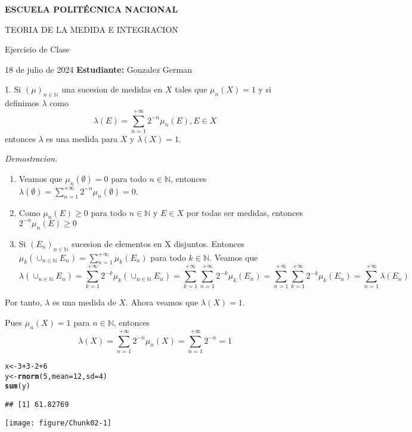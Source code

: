\documentclass{article}\usepackage[]{graphicx}\usepackage[]{xcolor}
\makeatletter
\def\maxwidth{ %
  \ifdim\Gin@nat@width>\linewidth
    \linewidth
  \else
    \Gin@nat@width
  \fi
}
\newcommand{\hlnum}[1]{\textcolor[rgb]{0.686,0.059,0.569}{#1}}%
\newcommand{\hlopt}[1]{\textcolor[rgb]{0,0,0}{#1}}%
\newcommand{\hldef}[1]{\textcolor[rgb]{0.345,0.345,0.345}{#1}}%
\newcommand{\hlkwb}[1]{\textcolor[rgb]{0.69,0.353,0.396}{#1}}%
\newcommand{\hlkwc}[1]{\textcolor[rgb]{0.333,0.667,0.333}{#1}}%
\newcommand{\hlkwd}[1]{\textcolor[rgb]{0.737,0.353,0.396}{\textbf{#1}}}%
\newenvironment{kframe}{%
 \def\at@end@of@kframe{}%
 \ifinner\ifhmode%
  \def\at@end@of@kframe{\end{minipage}}%
  \begin{minipage}{\columnwidth}%
 \fi\fi%
 \def\FrameCommand##1{\hskip\@totalleftmargin \hskip-\fboxsep
 \colorbox{shadecolor}{##1}\hskip-\fboxsep
     \hskip-\linewidth \hskip-\@totalleftmargin \hskip\columnwidth}%
 \MakeFramed {\advance\hsize-\width
   \@totalleftmargin\z@ \linewidth\hsize
   \@setminipage}}%
 {\par\unskip\endMakeFramed%
 \at@end@of@kframe}
\newenvironment{knitrout}{}{} %
\makeatother
\begin{document}
\hrulefill

\begin{center}
\textbf{ESCUELA POLITÉCNICA NACIONAL}

TEORIA DE LA MEDIDA E INTEGRACION
\end{center}
\begin{center}
    Ejercicio de Clase
\end{center}

18 de julio de 2024 \hfill \textbf{Estudiante:} Gonzalez German

\hrulefill

1. Si $(\mu)_{n \in \mathbb{N}}$ una sucesion de medidas en $X$ tales que $\mu_n(X)=1$ y si definimos $\lambda$ como $$\lambda(E)=\sum_{n=1}^{+\infty} 2^{-n} \mu_{n}(E) , E \in X$$
entonces $\lambda$ es una medida para $X$ y $\lambda(X)=1$.

\textit{Demostracion.} 
\begin{enumerate}
    \item Veamos que $\mu_n(\emptyset)=0$ para todo $n \in \mathbb{N}$, entonces $\lambda(\emptyset)=\sum_{n=1}^{+\infty} 2^{-n} \mu_{n}(\emptyset)=0$.
    \item Como $\mu_n(E) \geq 0$ para todo $n \in \mathbb{N}$ y $E \in X$ por todas ser medidas, entonces $2^{-n} \mu_n(E) \geq 0$
    \item Si $(E_n)_{n \in \mathbb{N}}$ sucesion de elementos en X disjuntos. Entonces $\mu_k (\cup_{n \in \mathbb{N}} E_n) = \sum_{n=1}^{+\infty} \mu_k (E_n)$ para todo $k\in \mathbb{N}$.
    Veamos que $$\lambda(\cup_{n \in \mathbb{N}} E_n)= \sum_{k=1}^{+\infty} 2^{-k} \mu_k (\cup_{n \in \mathbb{N}} E_n)=\sum_{k=1}^{+\infty} \sum_{n=1}^{+\infty} 2^{-k} \mu_k (E_n)=\sum_{n=1}^{+\infty} \sum_{k=1}^{+\infty}  2^{-k} \mu_k (E_n)= \sum_{n=1}^{+\infty} \lambda(E_n)$$
    
\end{enumerate}

Por tanto, $\lambda$ es una medida de $X$. Ahora veamos que $\lambda(X)=1$.

Pues $\mu_n(X)=1$ para $n\in \mathbb{N}$, entonces $$\lambda(X)=\sum_{n=1}^{+\infty} 2^{-n} \mu_n(X)= \sum_{n=1}^{+\infty} 2^{-n} =1$$ 

\begin{knitrout}
\color{fgcolor}\begin{kframe}
\begin{alltt}
\hldef{x} \hlkwb{<-} \hlnum{3}\hlopt{+}\hlnum{3}\hlopt{-}\hlnum{2}\hlopt{+}\hlnum{6}
\hldef{y} \hlkwb{<-} \hlkwd{rnorm}\hldef{(}\hlnum{5}\hldef{,}\hlkwc{mean}\hldef{=}\hlnum{12}\hldef{,}\hlkwc{sd}\hldef{=}\hlnum{4}\hldef{)}
\hlkwd{sum}\hldef{(y)}
\end{alltt}
\begin{verbatim}
## [1] 61.82769
\end{verbatim}
\end{kframe}
\end{knitrout}

\begin{knitrout}
\color{fgcolor}
\texttt{[image: figure/Chunk02-1]} 
\end{knitrout}
\end{document}
